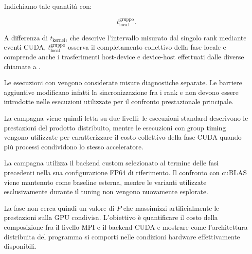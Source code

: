 Indichiamo tale quantità con:

\[
t_{\mathrm{local}}^{\mathrm{gruppo}}.
\]

A differenza di $t_{\mathrm{kernel}}$, che descrive l'intervallo misurato
dal singolo rank mediante eventi CUDA,
$t_{\mathrm{local}}^{\mathrm{gruppo}}$ osserva il completamento collettivo
della fase locale e comprende anche i trasferimenti host-device e
device-host effettuati dalle diverse chiamate a .

Le esecuzioni con  vengono considerate misure
diagnostiche separate. Le barriere aggiuntive modificano infatti la
sincronizzazione fra i rank e non devono essere introdotte nelle
esecuzioni utilizzate per il confronto prestazionale principale.

La campagna viene quindi letta su due livelli: le esecuzioni standard
descrivono le prestazioni del prodotto distribuito, mentre le esecuzioni
con group timing vengono utilizzate per caratterizzare il costo collettivo
della fase CUDA quando più processi condividono lo stesso acceleratore.

La campagna utilizza il backend custom selezionato al termine delle fasi
precedenti nella sua configurazione FP64 di riferimento. Il confronto con
cuBLAS viene mantenuto come baseline esterna, mentre le varianti utilizzate
esclusivamente durante il tuning non vengono nuovamente esplorate.

La fase non cerca quindi un valore di $P$ che massimizzi artificialmente
le prestazioni sulla GPU condivisa. L'obiettivo è quantificare il costo
della composizione fra il livello MPI e il backend CUDA e mostrare come
l'architettura distribuita del programma si comporti nelle condizioni
hardware effettivamente disponibili.